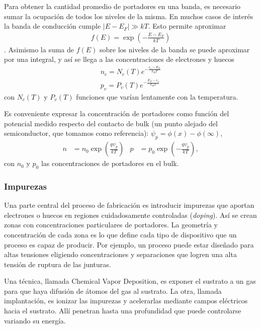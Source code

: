 Para obtener la cantidad promedio de portadores en una banda,
es necesario sumar la ocupación de todos los niveles de la misma. 
En muchos casos de interés la banda de conducción cumple 
$|E-E_F| \gg kT$.
Esto permite aproximar
\begin{align*}
    f(E) = \exp\left(-\frac{E-E_F}{kT}\right)
\end{align*}.
Asimismo la suma de $f(E)$ sobre los niveles de la banda se puede aproximar
por una integral, y así se llega a las concentraciones de electrones y huecos
\begin{align*}
    n_c = N_c(T)e^{-\frac{\epsilon_c-E_F}{k_BT}}\\
    p_v = P_v(T)e^{-\frac{E_F-\epsilon_v}{k_BT}}
\end{align*} con $N_c(T)$ y $P_v(T)$ funciones que varían lentamente con la
temperatura.

Es conveniente expresar la concentración de portadores 
como función del potencial medido respecto del contacto de bulk
(un punto alejado del semiconductor, que tomamos como referencia):
$\psi_p=\phi(x)-\phi(\infty)$,
\begin{align}
    n &= n_0\exp\left(\frac{q\psi_p}{kT}\right)&
    p &= p_0\exp\left(-\frac{q\psi_p}{kT}\right),
    \label{eq:portadores_nodegenerados}
\end{align}
con $n_0$ y $p_0$ las concentraciones de portadores en el bulk.
\subsubsection{Impurezas}
Una parte central del proceso de fabricación
es introducir impurezas que aportan electrones o huecos
en regiones cuidadosamente controladas (\emph{doping}).
Así se crean zonas con concentraciones particulares de portadores.
La geometría y concentración de cada zona
es lo que define cada tipo de dispositivo 
que un proceso es capaz de producir.
Por ejemplo, un proceso puede estar diseñado para altas tensiones
eligiendo concentraciones y separaciones 
que logren una alta tensión de ruptura de las junturas.

Una técnica, llamada Chemical Vapor Deposition,
es exponer el sustrato a un gas
para que haya difusión de átomos del gas al sustrato.
La otra, llamada implantación, es ionizar las impurezas 
y acelerarlas mediante campos eléctricos hacia el sustrato.
Allí penetran hasta una profundidad que puede controlarse 
variando su energía\cite{campbell_science_2001}.


